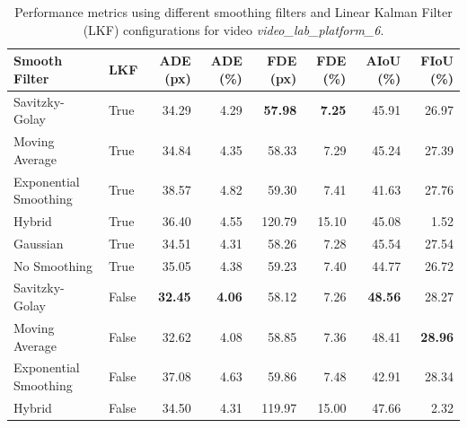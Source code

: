 \documentclass[12pt,oneside]{book} %
\begin{document}
\begin{table}[H]
    \centering
    \caption{Performance metrics using different smoothing filters and Linear Kalman Filter (LKF) configurations for video \textit{video\_lab\_platform\_6}.}
    \begin{adjustbox}{max width=\textwidth}
        \begin{tabular}{llrrrrrr}
            \toprule
            \textbf{Smooth Filter} & \textbf{LKF} & \textbf{ADE (px)} & \textbf{ADE (\%)} & \textbf{FDE (px)} & \textbf{FDE (\%)} & \textbf{AIoU (\%)} & \textbf{FIoU (\%)} \\
            \midrule
            Savitzky-Golay         & True         & 34.29             & 4.29              & \textbf{57.98}    & \textbf{7.25}     & 45.91              & 26.97              \\
            Moving Average         & True         & 34.84             & 4.35              & 58.33             & 7.29              & 45.24              & 27.39              \\
            Exponential Smoothing  & True         & 38.57             & 4.82              & 59.30             & 7.41              & 41.63              & 27.76              \\
            Hybrid                 & True         & 36.40             & 4.55              & 120.79            & 15.10             & 45.08              & 1.52               \\
            Gaussian               & True         & 34.51             & 4.31              & 58.26             & 7.28              & 45.54              & 27.54              \\
            No Smoothing           & True         & 35.05             & 4.38              & 59.23             & 7.40              & 44.77              & 26.72              \\
            Savitzky-Golay         & False        & \textbf{32.45}    & \textbf{4.06}     & 58.12             & 7.26              & \textbf{48.56}     & 28.27              \\
            Moving Average         & False        & 32.62             & 4.08              & 58.85             & 7.36              & 48.41              & \textbf{28.96}     \\
            Exponential Smoothing  & False        & 37.08             & 4.63              & 59.86             & 7.48              & 42.91              & 28.34              \\
            Hybrid                 & False        & 34.50             & 4.31              & 119.97            & 15.00             & 47.66              & 2.32               \\

\end{tabular}
\end{adjustbox}
\end{table}
\end{document}
